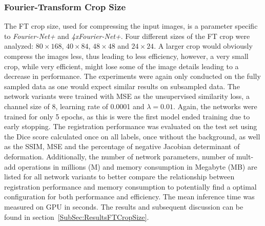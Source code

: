 \subsubsection{Fourier-Transform Crop Size} \label{SubSubSec:FTCropSize}
The FT crop size, used for compressing the input images, is a parameter specific to \emph{Fourier-Net+} and \emph{4xFourier-Net+}. Four different sizes of the FT crop were analyzed: $80 \times 168$, $40 \times 84$, $48 \times 48$ and $24 \times 24$. A larger crop would obviously compress the images less, thus leading to less efficiency, however, a very small crop, while very efficient, might lose some of the image details leading to a decrease in performance. The experiments were again only conducted on the fully sampled data as one would expect similar results on subsampled data. The network variants were trained with MSE as the unsupervised similarity loss, a channel size of 8, learning rate of 0.0001 and $\lambda=0.01$. Again, the networks were trained for only 5 epochs, as this is were the first model ended training due to early stopping. The registration performance was evaluated on the test set using the Dice score calculated once on all labels, once without the background, as well as the SSIM, MSE and the percentage of negative Jacobian determinant of deformation. Additionally, the number of network parameters, number of mult-add operations in millions (M) and memory consumption in Megabyte (MB) are listed for all network variants to better compare the relationship between registration performance and memory consumption to potentially find a optimal configuration for both performance and efficiency. The mean inference time was measured on GPU in seconds. The results and subsequent discussion can be found in section~\ref{SubSec:ResultsFTCropSize}.


